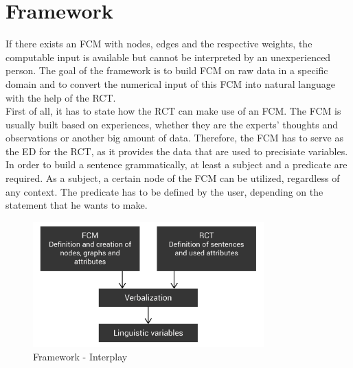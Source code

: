 \documentclass[conference]{IEEEtran}
\begin{document}
\section{Framework}
\label{sec:framework}
If there exists an FCM with nodes, edges and the respective weights, the computable input is available but cannot be interpreted by an unexperienced person. The goal of the framework is to build FCM on raw data in a specific domain and to convert the numerical input of this FCM into natural language with the help of the RCT.\\
First of all, it has to state how the RCT can make use of an FCM. The FCM is usually built based on experiences, whether they are the experts' thoughts and observations or another big amount of data. Therefore, the FCM has to serve as the ED for the RCT, as it provides the data that are used to precisiate variables.\\
In order to build a sentence grammatically, at least a subject and a predicate are required. As a subject, a certain node of the FCM can be utilized, regardless of any context. The predicate has to be defined by the user, depending on the statement that he wants to make. \\

\begin{figure}[ht]
\includegraphics[width=3.5in]{img/framework.png}
\centering
\caption{Framework - Interplay}
\label{fig:framework}
\end{figure}
\end{document}
